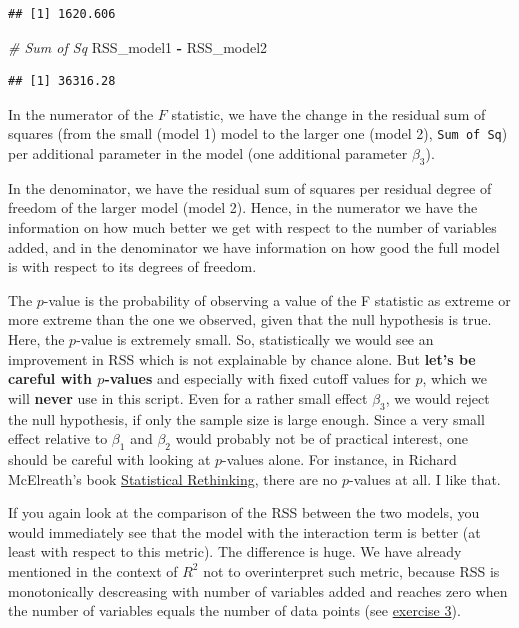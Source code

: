 \documentclass[
]{book}
\newenvironment{Shaded}{\begin{snugshade}}{\end{snugshade}}
\newcommand{\CommentTok}[1]{\textcolor[rgb]{0.56,0.35,0.01}{\textit{#1}}}
\newcommand{\NormalTok}[1]{#1}
\newcommand{\SpecialCharTok}[1]{\textcolor[rgb]{0.81,0.36,0.00}{\textbf{#1}}}
\begin{document}
\begin{verbatim}
## [1] 1620.606
\end{verbatim}

\begin{Shaded}
\begin{Highlighting}[]
\CommentTok{\# Sum of Sq}
\NormalTok{RSS\_model1 }\SpecialCharTok{{-}}\NormalTok{ RSS\_model2}
\end{Highlighting}
\end{Shaded}

\begin{verbatim}
## [1] 36316.28
\end{verbatim}

In the numerator of the \(F\) statistic, we have the change in the residual sum of squares
(from the small (model 1) model to the larger one (model 2), \texttt{Sum\ of\ Sq})
per additional parameter in the model (one additional parameter \(\beta_3\)).

In the denominator, we have the residual sum of squares per residual degree of freedom of
the larger model (model 2). Hence, in the numerator we have the information on how much
better we get with respect to the number of variables added, and in the denominator
we have information on how good the full model is with respect to its degrees of freedom.

The \(p\)-value is the probability of observing a value of the F statistic as extreme or more
extreme than the one we observed, given that the null hypothesis is true. Here,
the \(p\)-value is extremely small. So, statistically we would see an improvement in RSS
which is not explainable by chance alone.
But \textbf{let's be careful with \(p\)-values} and especially with fixed cutoff values for \(p\),
which we will \textbf{never} use in this script.
Even for a rather small effect \(\beta_3\), we would reject the null hypothesis, if only the sample
size is large enough. Since a very small effect relative to \(\beta_1\) and \(\beta_2\) would
probably not be of practical interest, one should be careful with looking at \(p\)-values alone.
For instance, in Richard McElreath's book \href{https://xcelab.net/rm/statistical-rethinking/}{Statistical Rethinking},
there are no \(p\)-values at all. I like that.

If you again look at the comparison of the RSS between the two models, you would
immediately see that the model with the interaction term is better (at least with respect to this metric).
The difference is huge. We have already mentioned in the context of \(R^2\) not to overinterpret
such metric, because RSS is monotonically descreasing with number of variables added and reaches
zero when the number of variables equals the number of data points (see \hyperref[exercise3_multiple_regression]{exercise 3}).
\end{document}
